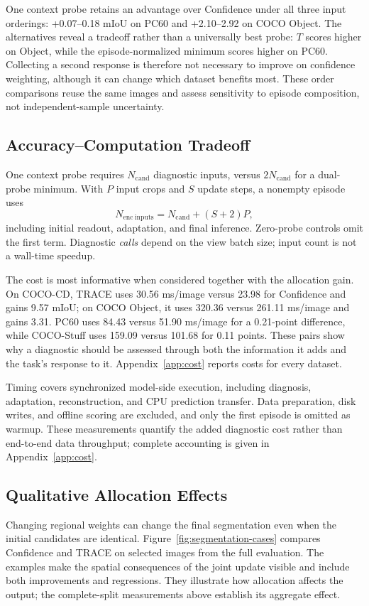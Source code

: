 \documentclass[letterpaper]{article}
\begin{document}
One context probe retains an advantage over Confidence under all three input orderings: +0.07--0.18 mIoU on PC60 and +2.10--2.92 on COCO Object. The alternatives reveal a tradeoff rather than a universally best probe: $T$ scores higher on Object, while the episode-normalized minimum scores higher on PC60. Collecting a second response is therefore not necessary to improve on confidence weighting, although it can change which dataset benefits most. These order comparisons reuse the same images and assess sensitivity to episode composition, not independent-sample uncertainty.

\subsection{Accuracy--Computation Tradeoff}
One context probe requires $N_{\mathrm{cand}}$ diagnostic inputs, versus $2N_{\mathrm{cand}}$ for a dual-probe minimum. With $P$ input crops and $S$ update steps, a nonempty episode uses
\begin{equation}
N_{\mathrm{enc\ inputs}}=N_{\mathrm{cand}}+(S+2)P,
\end{equation}
including initial readout, adaptation, and final inference. Zero-probe controls omit the first term. Diagnostic \emph{calls} depend on the view batch size; input count is not a wall-time speedup.

The cost is most informative when considered together with the allocation gain. On COCO-CD, TRACE uses 30.56 ms/image versus 23.98 for Confidence and gains 9.57 mIoU; on COCO Object, it uses 320.36 versus 261.11 ms/image and gains 3.31. PC60 uses 84.43 versus 51.90 ms/image for a 0.21-point difference, while COCO-Stuff uses 159.09 versus 101.68 for 0.11 points. These pairs show why a diagnostic should be assessed through both the information it adds and the task's response to it. Appendix~\ref{app:cost} reports costs for every dataset.

Timing covers synchronized model-side execution, including diagnosis, adaptation, reconstruction, and CPU prediction transfer. Data preparation, disk writes, and offline scoring are excluded, and only the first episode is omitted as warmup. These measurements quantify the added diagnostic cost rather than end-to-end data throughput; complete accounting is given in Appendix~\ref{app:cost}.

\subsection{Qualitative Allocation Effects}
Changing regional weights can change the final segmentation even when the initial candidates are identical. Figure~\ref{fig:segmentation-cases} compares Confidence and TRACE on selected images from the full evaluation. The examples make the spatial consequences of the joint update visible and include both improvements and regressions. They illustrate how allocation affects the output; the complete-split measurements above establish its aggregate effect.
\end{document}
